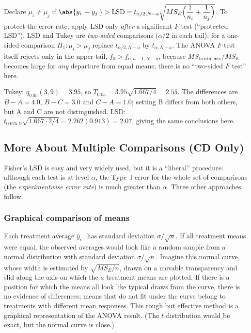 \begin{definition}
Declare $\mu_i\ne\mu_j$ if $\abs{\bar{y}_{i\cdot}-\bar{y}_{j\cdot}}>\mathrm{LSD}=t_{\alpha/2,N-a}\sqrt{MS_E\Big(\dfrac1{n_i}+\dfrac1{n_j}\Big)}$. To protect the error rate, apply LSD only \emph{after} a significant $F$-test (``protected LSD''). LSD and Tukey are \emph{two-sided} comparisons ($\alpha/2$ in each tail); for a one-sided comparison $H_1:\mu_i>\mu_j$ replace $t_{\alpha/2,N-a}$ by $t_{\alpha,N-a}$. The ANOVA $F$-test itself rejects only in the upper tail, $f_0>f_{\alpha,a-1,N-a}$, because $MS_{\text{treatments}}/MS_E$ becomes large for \emph{any} departure from equal means; there is no ``two-sided $F$ test'' here.
\end{definition}

\begin{example}
Tukey: $q_{0.05}(3,9)=3.95$, so $T_{0.05}=3.95\sqrt{1.667/4}=2.55$. The differences are $B-A=4.0$, $B-C=3.0$ and $C-A=1.0$; setting B differs from both others, but A and C are not distinguished. LSD: $t_{0.025,9}\sqrt{1.667\cdot2/4}=2.262(0.913)=2.07$, giving the same conclusions here.
\end{example}

\subsection{More About Multiple Comparisons (CD Only)}

Fisher's LSD is easy and very widely used, but it is a ``liberal'' procedure: although each test is at level $\alpha$, the Type~I error for the whole set of comparisons (the \emph{experimentwise error rate}) is much greater than $\alpha$. Three other approaches follow.

\subsubsection*{Graphical comparison of means}

Each treatment average $\bar{y}_{i\cdot}$ has standard deviation $\sigma/\sqrt n$. If all treatment means were equal, the observed averages would look like a random sample from a normal distribution with standard deviation $\sigma/\sqrt n$. Imagine this normal curve, whose width is estimated by $\sqrt{MS_E/n}$, drawn on a movable transparency and slid along the axis on which the $a$ treatment means are plotted. If there is a position for which the means all look like typical draws from the curve, there is no evidence of differences; means that do not fit under the curve belong to treatments with different mean responses. This rough but effective method is a graphical representation of the ANOVA result. (The $t$ distribution would be exact, but the normal curve is close.)

